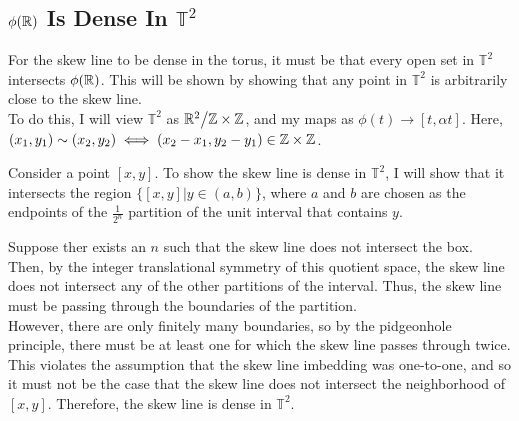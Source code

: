 \subsection*{$\phi(\mathbb{R})$ Is Dense In $\mathbb{T}^2$}

For the skew line to be dense in the torus, it must be that every open
set in $\mathbb{T}^2$ intersects $\phi(\mathbb{R})$.
This will be shown by showing that any point in $\mathbb{T}^2$ is arbitrarily
close to the skew line.
\\
To do this, I will view $\mathbb{T}^2$ as $\mathbb{R}^2\big/ \mathbb{Z}\times\mathbb{Z}$, and my maps as
$\phi(t)\to[t,\alpha t]$. Here, $(x_1,y_1) \sim (x_2,y_2) \iff (x_2-x_1,y_2-y_1)
\in \mathbb{Z} \times \mathbb{Z}$.
\par
Consider a point $[x,y]$. To show the skew line is dense in $\mathbb{T}^2$, I
will show that it intersects the region $\{[x,y]|y\in(a,b)\}$, where $a$ and $b$
are chosen as the endpoints of the $\frac{1}{2^n}$ partition of the unit
interval that contains $y$.
\par
Suppose ther exists an $n$ such that the skew line does not intersect the box.
Then, by the integer translational symmetry of this quotient space, the skew
line does not intersect any of the other partitions of the interval. Thus, the
skew line must be passing through the boundaries of the partition.
\\
However, there are only finitely many boundaries, so by the pidgeonhole
principle, there must be at least one for which the skew line passes through
twice. This violates the assumption that the skew line imbedding was one-to-one,
and so it must not be the case that the skew line does not intersect the
neighborhood of $[x,y]$. Therefore, the skew line is dense in $\mathbb{T}^2$.


